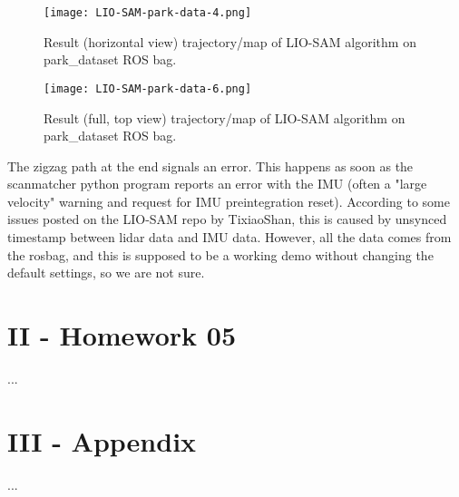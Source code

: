 \documentclass{article}
\begin{document}
\begin{figure}[H]
    \centering
    \texttt{[image: LIO-SAM-park-data-4.png]}
    \caption{\label{LIO-SAM-park-data-4}Result (horizontal view) trajectory/map of LIO-SAM algorithm on park\_dataset ROS bag.}
\end{figure}

\begin{figure}[H]
    \centering
    \texttt{[image: LIO-SAM-park-data-6.png]}
    \caption{\label{LIO-SAM-park-data-6}Result (full, top view) trajectory/map of LIO-SAM algorithm on park\_dataset ROS bag.}
\end{figure}

The zigzag path at the end signals an error. This happens as soon as the scanmatcher python program reports an error with the IMU (often a "large velocity" warning and request for IMU preintegration reset). According to some issues posted on the LIO-SAM repo by TixiaoShan, this is caused by unsynced timestamp between lidar data and IMU data. However, all the data comes from the rosbag, and this is supposed to be a working demo without changing the default settings, so we are not sure.


\hspace{1cm}


\section*{II - Homework 05}

...

\hspace{1cm}


\section*{III - Appendix}

...
\end{document}

